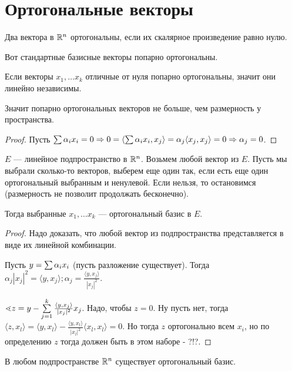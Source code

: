 \documentclass[12pt]{report}
\begin{document}
\section{Ортогональные векторы}

\begin{defn}
Два вектора в $\mathbb{R}^n$ ортогональны, если их скалярное произведение равно нулю.

Вот стандартные базисные векторы попарно ортогональны.
\end{defn}

\begin{lm}
Если векторы $x_1, \dots x_k$ отличные от нуля попарно ортогональны, значит они линейно независимы.

Значит попарно ортогональных векторов не больше, чем размерность у пространства.
\end{lm}
\begin{proof}
Пусть $\sum\limits{\alpha_i x_i} = 0 \Rightarrow 0 = \langle \sum\limits{\alpha_i x_i}, x_j \rangle = \alpha_j \langle x_j, x_j\rangle = 0 \Rightarrow \alpha_j = 0$.
\end{proof}

\begin{st}
$E$ --- линейное подпространство в $\mathbb{R}^n$. Возьмем любой вектор из $E$. Пусть мы выбрали сколько-то векторов, выберем еще один так, если есть еще один ортогональный выбранным и ненулевой. Если нельзя, то остановимся (размерность не позволит продолжать бесконечно).

Тогда выбранные $x_1, \dots x_k$ --- ортогональный базис в $E$.
\end{st}
\begin{proof}
Надо доказать, что любой вектор из подпространства представляется в виде их линейной комбинации. 

Пусть $y = \sum\limits{\alpha_i x_i}$ (пусть разложение существует). Тогда $\alpha_j |x_j|^2 = \langle y, x_j\rangle; \alpha_j = \frac{\langle y, x_j\rangle}{|x_j|^2}$.

$\lessdot z = y - \sum\limits_{j = 1}^k{\frac{\langle y, x_j\rangle}{|x_j|^2}x_j}$. Надо, чтобы $z = 0$. Ну пусть нет, тогда $\langle z, x_l\rangle = \langle y, x_l\rangle - \frac{\langle y, x_l\rangle}{|x_l|^2}\langle x_l, x_l\rangle = 0$. Но тогда $z$ ортогонально всем $x_i$, но по определению $z$ тогда должен быть в этом наборе - ?!?.
\end{proof}

\begin{thm}[Cor]
В любом подпространстве $\mathbb{R}^n$ существует ортогональный базис.
\end{thm}
\end{document}
